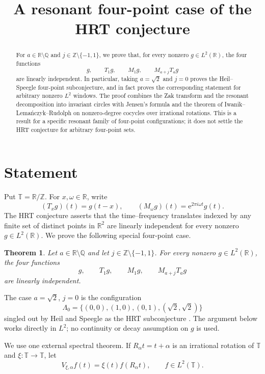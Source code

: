 \documentclass[11pt]{amsart}
\title{A resonant four-point case of the HRT conjecture}
\author{}
\date{}
\newtheorem{theorem}{Theorem}
\theoremstyle{remark}
\newcommand{\Q}{\mathbb Q}
\newcommand{\R}{\mathbb R}
\newcommand{\Z}{\mathbb Z}
\newcommand{\T}{\mathbb T}
\newcommand{\e}{\mathrm e}
\begin{document}
\begin{abstract}
For $a\in\R\setminus\Q$ and $j\in\Z\setminus\{-1,1\}$, we prove that, for every nonzero
$g\in L^2(\R)$, the four functions
\[
 g,\qquad T_1g,\qquad M_1g,\qquad M_{a+j}T_ag
\]
are linearly independent. In particular, taking $a=\sqrt2$ and $j=0$ proves the
Heil--Speegle four-point subconjecture, and in fact proves the corresponding statement
for arbitrary nonzero $L^2$ windows. The proof combines the Zak transform and the
resonant decomposition into invariant circles with Jensen's formula and the theorem of
Iwanik--Lema\'nczyk--Rudolph on nonzero-degree cocycles over irrational rotations.
This is a result for a specific resonant family of four-point configurations; it does not
settle the HRT conjecture for arbitrary four-point sets.
\end{abstract}

\maketitle

\section{Statement}

Put $\T=\R/\Z$. For $x,\omega\in\R$, write
\[
 (T_xg)(t)=g(t-x),\qquad (M_\omega g)(t)=\e^{2\pi i\omega t}g(t).
\]
The HRT conjecture asserts that the time--frequency translates indexed by any finite set
of distinct points in $\R^2$ are linearly independent for every nonzero $g\in L^2(\R)$.
We prove the following special four-point case.

\begin{theorem}\label{thm:main}
Let $a\in\R\setminus\Q$ and let $j\in\Z\setminus\{-1,1\}$. For every nonzero
$g\in L^2(\R)$, the four functions
\[
 g,\qquad T_1g,\qquad M_1g,\qquad M_{a+j}T_ag
\]
are linearly independent.
\end{theorem}

The case $a=\sqrt2$, $j=0$ is the configuration
\[
 \Lambda_0=\{(0,0),(1,0),(0,1),(\sqrt2,\sqrt2)\}
\]
singled out by Heil and Speegle as the HRT subconjecture \cite[Conjecture~2]{HeilSpeegle}.
The argument below works directly in $L^2$; no continuity or decay assumption on $g$ is
used.

We use one external spectral theorem. If $R_\alpha t=t+\alpha$ is an irrational
rotation of $\T$ and $\xi:\T\to\T$, let
\[
 V_{\xi,\alpha}f(t)=\xi(t)f(R_\alpha t),\qquad f\in L^2(\T).
\]
\end{document}
